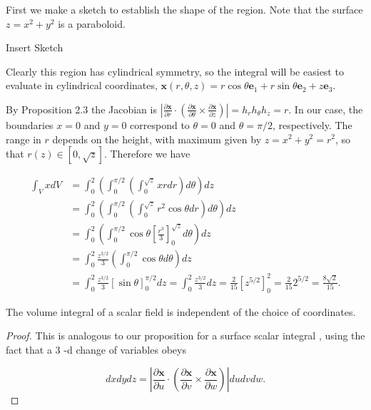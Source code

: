 \begin{example}[Let \(V\) be the region bounded by the planes \(x=0, y=0, z=2\) and the surface \(z=x^2+y^2\) for \(x, y \geq 0\). Calculate \(\int_V x d V\).]

First we make a sketch to establish the shape of the region. Note that the surface \(z=x^2+y^2\) is a paraboloid.

Insert Sketch

Clearly this region has cylindrical symmetry, so the integral will be easiest to evaluate in cylindrical coordinates, \(\boldsymbol{x}(r, \theta, z)=r \cos \theta \boldsymbol{e}_1+r \sin \theta \boldsymbol{e}_2+z \boldsymbol{e}_3\).

By Proposition 2.3 the Jacobian is \(\left|\frac{\partial \boldsymbol{x}}{\partial r} \cdot\left(\frac{\partial \boldsymbol{x}}{\partial \theta} \times \frac{\partial \boldsymbol{x}}{\partial z}\right)\right|=h_r h_\theta h_z=r\).
In our case, the boundaries \(x=0\) and \(y=0\) correspond to \(\theta=0\) and \(\theta=\pi / 2\), respectively. The range in \(r\) depends on the height, with maximum given by \(z=x^2+y^2=r^2\), so that \(r(z) \in[0, \sqrt{z}]\). Therefore we have

\[
\begin{aligned}
\int_V x d V & =\int_0^2\left(\int_0^{\pi / 2}\left(\int_0^{\sqrt{z}} x r d r\right) d \theta\right) d z \\
& =\int_0^2\left(\int_0^{\pi / 2}\left(\int_0^{\sqrt{z}} r^2 \cos \theta d r\right) d \theta\right) d z \\
& =\int_0^2\left(\int_0^{\pi / 2} \cos \theta\left[\frac{r^3}{3}\right]_0^{\sqrt{z}} d \theta\right) d z \\
& =\int_0^2 \frac{z^{3 / 2}}{3}\left(\int_0^{\pi / 2} \cos \theta d \theta\right) d z \\
& =\int_0^2 \frac{z^{3 / 2}}{3}[\sin \theta]_0^{\pi / 2} d z=\int_0^2 \frac{z^{3 / 2}}{3} d z=\frac{2}{15}\left[z^{5 / 2}\right]_0^2=\frac{2}{15} 2^{5 / 2}=\frac{8 \sqrt{2}}{15} .
\end{aligned}
\]
\end{example}

\begin{proposition}
  The volume integral of a scalar field is independent of the choice of coordinates.
\end{proposition}

\begin{proof}
  This is analogous to our proposition for a surface scalar integral , using the fact that a 3 -d change of variables obeys

\[
d x d y d z=\left|\frac{\partial \boldsymbol{x}}{\partial u} \cdot\left(\frac{\partial \boldsymbol{x}}{\partial v} \times \frac{\partial \boldsymbol{x}}{\partial w}\right)\right| d u d v d w .
\]
\end{proof}

